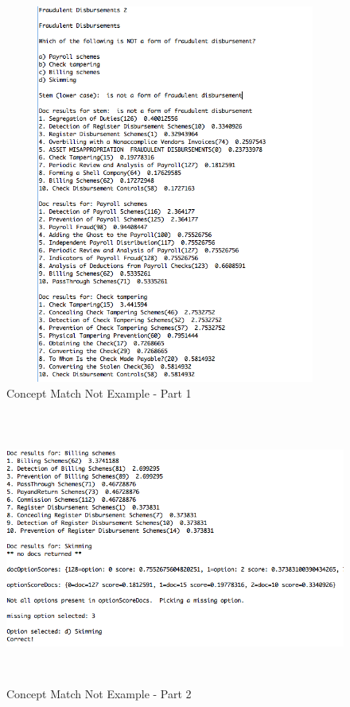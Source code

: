 \begin{figure}
\centering
\vspace{0.75in}
\includegraphics[width=125mm, height=125mm]{concept_match_not_example_part_1.png}
\caption{Concept Match Not Example - Part 1}
\label{fig:concept_match_not_example_part_1}
\end{figure}

\begin{figure}
\centering
\vspace{0.75in}
\includegraphics[width=125mm, height=90mm]{concept_match_not_example_part_2.png}
\caption{Concept Match Not Example - Part 2}
\label{fig:concept_match_not_example_part_2}
\end{figure}

